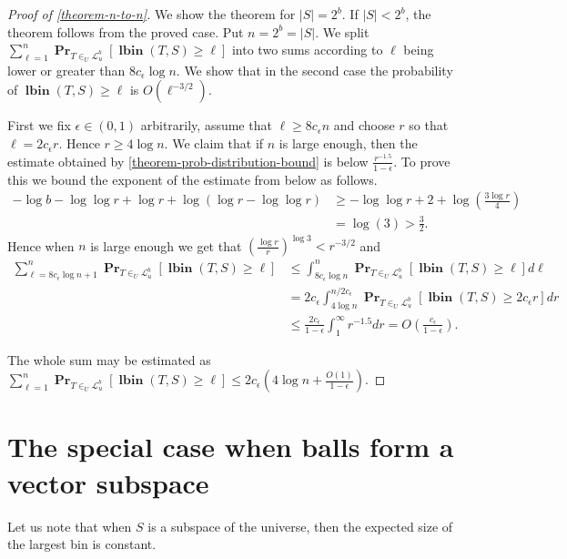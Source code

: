 ﻿\documentclass[review]{elsarticle}
\newcommand{\lbin}[2]{\operatorname{\mathbf{lbin}}({#1}, {#2})}
\newcommand{\linearmaps}[2]{\mathcal{L}_{#1}^{#2}}
\newcommand{\probs}[2]{\operatorname{\mathbf{Pr}}_{{#1}}\left[{#2}\right]}
\begin{document}
\begin{proof}[Proof of \cref{theorem-n-to-n}]
We show the theorem for $|S| = 2^b$.
If $|S| < 2^b$, the theorem follows from the proved case.
Put $n = 2^b = |S|$.
We split $\sum_{\ell = 1}^{n} \probs{T\in_U\linearmaps{u}{b}}{\lbin{T}{S} \geq \ell}$ into two sums according to $\ell$ being lower or greater than $8c_\epsilon \log n$.
We show that in the second case the probability of $\lbin{T}{S} \geq \ell$ is $O(\ell^{-3/2})$.

First we fix $\epsilon \in (0, 1)$ arbitrarily, assume that $\ell \geq 8c_\epsilon n$ and choose $r$ so that $\ell = 2 c_\epsilon r$.
Hence $r \geq 4\log n$.
We claim that if $n$ is large enough, then the estimate obtained by \cref{theorem-prob-distribution-bound} is below $\frac{r^{-1.5}}{1-\epsilon}$.
To prove this we bound the exponent of the estimate from below as follows.
\begin{align*}
-\log b - \log \log r + \log r + \log (\log r - \log \log r) 
	& \geq -\log \log r + 2 + \log \left(\frac{3\log r}{4}\right) \\
	& = \log(3) > \frac{3}{2}.
\end{align*}
Hence when $n$ is large enough we get that $\left(\frac{\log r}{r}\right)^{\log 3} < r^{-3/2}$ and
\begin{align*}
\sum_{\ell = 8c_\epsilon \log n + 1}^{n} \probs{T\in_U\linearmaps{u}{b}}{\lbin{T}{S} \geq \ell} 
	& \leq \int_{8c_\epsilon \log n}^{n} \probs{T\in_U\linearmaps{u}{b}}{\lbin{T}{S} \geq \ell} d\ell \\
	& = 2c_\epsilon \int_{4 \log n}^{n/2c_\epsilon} \probs{T\in_U\linearmaps{u}{b}}{\lbin{T}{S} \geq 2c_\epsilon r} dr \\
	& \leq \frac{2c_\epsilon}{1-\epsilon} \int_{1}^{\infty} r^{-1.5} dr = O\left(\frac{c_\epsilon}{1-\epsilon}\right).
\end{align*}

The whole sum may be estimated as $
\sum_{\ell = 1}^{n} \probs{T\in_U\linearmaps{u}{b}}{\lbin{T}{S} \geq \ell} \leq 2c_\epsilon \left(4 \log n + \frac{O(1)}{1-\epsilon}\right).$
\end{proof}

\section{The special case when balls form a vector subspace}

Let us note that when $S$ is a subspace of the universe, then the expected size of the largest bin is constant.
\end{document}

